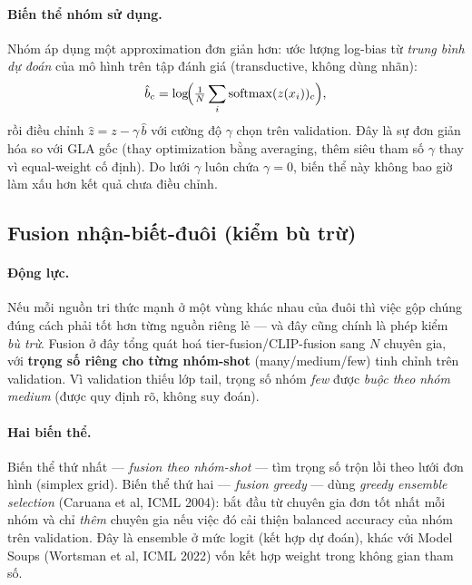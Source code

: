 \paragraph{Biến thể nhóm sử dụng.}
Nhóm áp dụng một approximation đơn giản hơn: ước lượng log-bias từ \emph{trung bình dự đoán} của
mô hình trên tập đánh giá (transductive, không dùng nhãn):
\[
  \hat b_c = \log\!\Bigl(\tfrac{1}{N}\sum_i \mathrm{softmax}(z(x_i))_c\Bigr),
\]
rồi điều chỉnh $\hat{z} = z - \gamma\, \hat b$ với cường độ $\gamma$ chọn trên validation. Đây là
sự đơn giản hóa so với GLA gốc (thay optimization bằng averaging, thêm siêu tham số $\gamma$ thay
vì equal-weight cố định). Do lưới $\gamma$ luôn chứa $\gamma=0$, biến thể này không bao giờ làm xấu
hơn kết quả chưa điều chỉnh.


\subsection{Fusion nhận-biết-đuôi (kiểm bù trừ)}
\paragraph{Động lực.} Nếu mỗi nguồn tri thức mạnh ở một vùng khác nhau của đuôi thì việc gộp chúng
đúng cách phải tốt hơn từng nguồn riêng lẻ --- và đây cũng chính là phép kiểm \emph{bù trừ}. Fusion
ở đây tổng quát hoá tier-fusion/CLIP-fusion sang $N$ chuyên gia, với \textbf{trọng số riêng cho từng
nhóm-shot} (many/medium/few) tinh chỉnh trên validation. Vì validation thiếu lớp tail, trọng số
nhóm \emph{few} được \emph{buộc theo nhóm medium} (được quy định rõ, không suy đoán).
\paragraph{Hai biến thể.} 
Biến thể thứ nhất --- \emph{fusion theo nhóm-shot} --- tìm trọng số trộn lồi theo lưới đơn hình (simplex
grid). Biến thể thứ hai --- \emph{fusion greedy} --- dùng \emph{greedy ensemble selection} \cite{caruana2004ensemble} (Caruana et al, ICML 2004): bắt đầu từ chuyên gia đơn tốt nhất mỗi nhóm và chỉ \emph{thêm} chuyên gia nếu
việc đó cải thiện balanced accuracy của nhóm trên validation. Đây là ensemble ở mức logit (kết hợp
dự đoán), khác với Model Soups \cite{wortsman2022soups} (Wortsman et al, ICML 2022) vốn kết hợp weight trong không gian
tham số.
 
